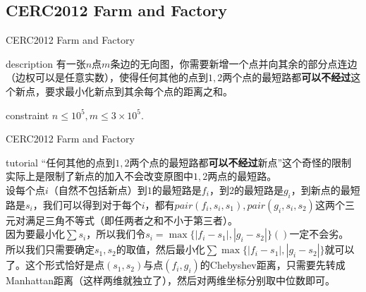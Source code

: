 \documentclass{beamer}
\begin{document}
\subsection{CERC2012 Farm and Factory}
\begin{frame}{CERC2012 Farm and Factory}
	\begin{block}{description}
		有一张$n$点$m$条边的无向图，你需要新增一个点并向其余的部分点连边（边权可以是任意实数），使得任何其他的点到$1, 2$两个点的最短路都\textbf{可以不经过}这个新点，要求最小化新点到其余每个点的距离之和。
	\end{block}
	\begin{block}{constraint}
		$n \le 10^5, m \le 3 \times 10^5.$
	\end{block}
\end{frame}
\begin{frame}{CERC2012 Farm and Factory}
	\begin{block}{tutorial}
		“任何其他的点到$1, 2$两个点的最短路都\textbf{可以不经过}新点”这个奇怪的限制实际上是限制了新点的加入不会改变原图中$1, 2$两点的最短路。\\
		
		设每个点$i$（自然不包括新点）到$1$的最短路是$f_i$，到$2$的最短路是$g_i$，到新点的最短路是$s_i$，我们可以得到对于每个$i$，都有$pair(f_i, s_i, s_1), pair(g_i, s_i, s_2)$这两个三元对满足三角不等式（即任两者之和不小于第三者）。\\
		
		因为要最小化$\sum s_i$，所以我们令$s_i = \max\{|f_i - s_1|, |g_i - s_2|\}()$一定不会劣。\\
		
		所以我们只需要确定$s_1, s_2$的取值，然后最小化$\sum \max\{|f_i - s_1|, |g_i - s_2|\}$就可以了。这个形式恰好是点$(s_1, s_2)$与点$(f_i, g_i)$的Chebyshev距离，只需要先转成Manhattan距离（这样两维就独立了），然后对两维坐标分别取中位数即可。
	\end{block}
\end{frame}
\end{document}
